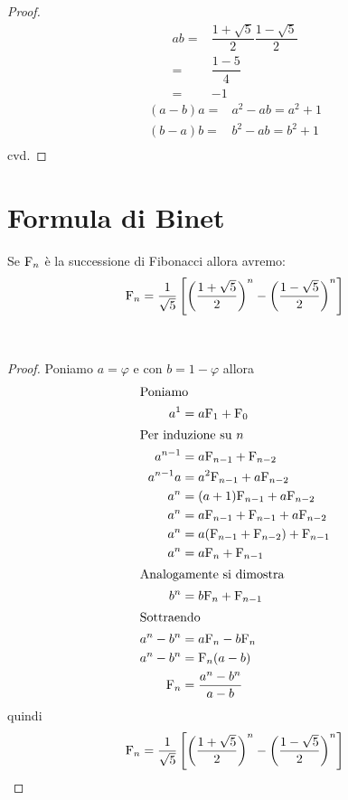 \begin{proof}
	\begin{align*}
		ab={}&\dfrac{1+\sqrt{5}}{2}\dfrac{1-\sqrt{5}}{2}\\
		={}&\dfrac{1-5}{4}\\
		={}&-1
	\end{align*}
	\begin{align*}
		(a-b)a={}&a^2-ab=a^2+1\\
		(b-a)b={}&b^2-ab=b^2+1\\
	\end{align*}
	cvd.
\end{proof}
\section{Formula di Binet}
\begin{thm}
	Se $\mathrm{F}_{n}$ è la successione di Fibonacci allora avremo:
	\begin{equation}
		\mathrm{F}_{n}=\dfrac{1}{\sqrt{5}}\left[\left(\dfrac{1+\sqrt{5}}{2}\right)^n-\left(\dfrac{1-\sqrt{5}}{2}\right)^n\right]
	\end{equation}\label{eqn:FinBinet}
\end{thm}~\cite{Conti2020}
\begin{proof}
	Poniamo $a=\varphi$ e con $b=1-\varphi$ allora
	\begin{align*}
		\intertext{Poniamo}
		a^1={}&a\mathrm{F}_{1}+\mathrm{F}_{0}\\
		\intertext{Per induzione su $n$}
		a^{n-1}={}&a\mathrm{F}_{n-1}+\mathrm{F}_{n-2}\\
		a^{n-1}a={}&a^2\mathrm{F}_{n-1}+a\mathrm{F}_{n-2}\\
		a^{n}={}&(a+1)\mathrm{F}_{n-1}+a\mathrm{F}_{n-2}\\
		a^{n}={}&a\mathrm{F}_{n-1}+\mathrm{F}_{n-1}+a\mathrm{F}_{n-2}\\
		a^{n}={}&a(\mathrm{F}_{n-1}+\mathrm{F}_{n-2})+\mathrm{F}_{n-1}\\
		a^{n}={}&a\mathrm{F}_{n}+\mathrm{F}_{n-1}\\
		\intertext{Analogamente si dimostra}
		b^{n}={}&b\mathrm{F}_{n}+\mathrm{F}_{n-1}\\
		\intertext{Sottraendo}
		a^n-b^n={}&a\mathrm{F}_{n}-b\mathrm{F}_{n}\\
		a^n-b^n={}&\mathrm{F}_{n}(a-b)\\
		\mathrm{F}_{n}={}&\dfrac{a^n-b^n}{a-b}
	\end{align*}
quindi
\begin{equation}
\mathrm{F}_{n}=\dfrac{1}{\sqrt{5}}\left[\left(\dfrac{1+\sqrt{5}}{2}\right)^n-\left(\dfrac{1-\sqrt{5}}{2}\right)^n\right]
\end{equation}
\end{proof}
